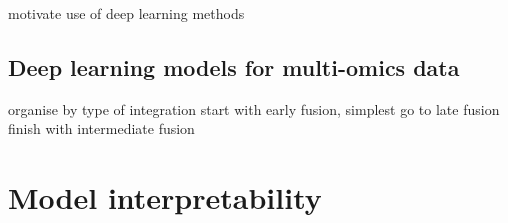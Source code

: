 \documentclass[../main.tex]{subfiles}
\begin{document}
	 motivate use of deep learning methods
 \subsection{Deep learning models for multi-omics data}
 organise by type of integration 
 start with early fusion, simplest
 go to late fusion
 finish with intermediate fusion 



\section{Model interpretability}



\end{document}
